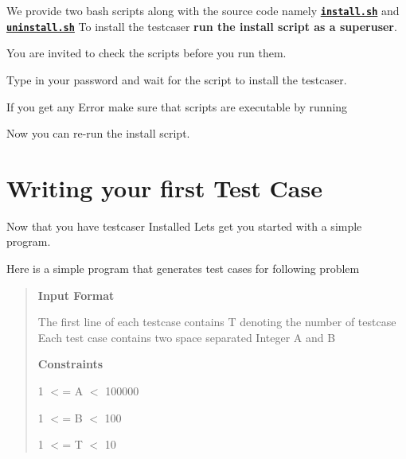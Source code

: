 We provide two bash scripts along with the source code namely 
\href{https://github.com/coder3101/testcaser/install.sh}{\texttt{ {\bfseries{install.\+sh}}}} and 
\href{https://github.com/coder3101/testcaser/install.sh}{\texttt{ {\bfseries{uninstall.\+sh}}}} To install the testcaser {\bfseries{run the install script as a superuser}}.

You are invited to check the scripts before you run them.


\begin{DoxyCode}{0}
\end{DoxyCode}


Type in your password and wait for the script to install the testcaser.

If you get any Error make sure that scripts are executable by running 
\begin{DoxyCode}{0}
\end{DoxyCode}


Now you can re-\/run the install script.\hypertarget{index_started}{}\section{Writing your first Test Case}\label{index_started}
Now that you have testcaser Installed Let\textquotesingle{}s get you started with a simple program.

Here is a simple program that generates test cases for following problem \begin{quote}
{\bfseries{Input Format}}

The first line of each testcase contains T denoting the number of testcase Each test case contains two space separated Integer A and B

{\bfseries{Constraints}}

1 $<$= A $<$ 100000

1 $<$= B $<$ 100

1 $<$= T $<$ 10 \end{quote}



